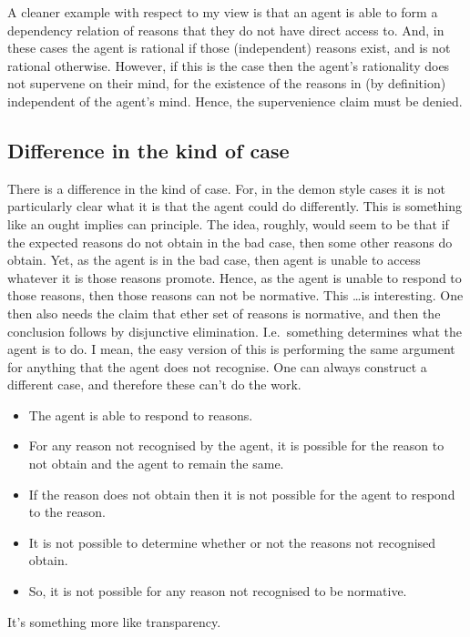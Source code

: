 \documentclass[10pt]{article}
\begin{document}
A cleaner example with respect to my view is that an agent is able to form a dependency relation of reasons that they do not have direct access to.
And, in these cases the agent is rational if those (independent) reasons exist, and is not rational otherwise.
However, if this is the case then the agent's rationality does not supervene on their mind, for the existence of the reasons in (by definition) independent of the agent's mind.
Hence, the supervenience claim must be denied.


\subsection{Difference in the kind of case}
\label{sec:difference-kind-case}

There is a difference in the kind of case.
For, in the demon style cases it is not particularly clear what it is that the agent could do differently.
This is something like an ought implies can principle.
The idea, roughly, would seem to be that if the expected reasons do not obtain in the bad case, then some other reasons do obtain.
Yet, as the agent is in the bad case, then agent is unable to access whatever it is those reasons promote.
Hence, as the agent is unable to respond to those reasons, then those reasons can not be normative.
This \dots is interesting.
One then also needs the claim that ether set of reasons is normative, and then the conclusion follows by disjunctive elimination.
I.e.\ something determines what the agent is to do.
I mean, the easy version of this is performing the same argument for anything that the agent does not recognise.
One can always construct a different case, and therefore these can't do the work.

\begin{itemize}
\item The agent is able to respond to reasons.
\item For any reason not recognised by the agent, it is possible for the reason to not obtain and the agent to remain the same.
\item If the reason does not obtain then it is not possible for the agent to respond to the reason.
\item It is not possible to determine whether or not the reasons not recognised obtain.
\item So, it is not possible for any reason not recognised to be normative.
\end{itemize}

It's something more like transparency.
\end{document}
